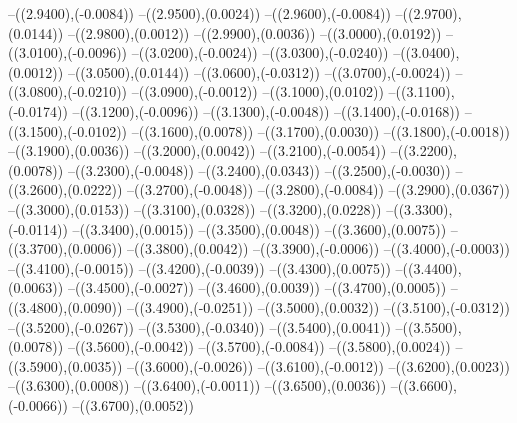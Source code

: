 {	--({\sx*(2.9400)},{\sy*(-0.0084)})
	--({\sx*(2.9500)},{\sy*(0.0024)})
	--({\sx*(2.9600)},{\sy*(-0.0084)})
	--({\sx*(2.9700)},{\sy*(0.0144)})
	--({\sx*(2.9800)},{\sy*(0.0012)})
	--({\sx*(2.9900)},{\sy*(0.0036)})
	--({\sx*(3.0000)},{\sy*(0.0192)})
	--({\sx*(3.0100)},{\sy*(-0.0096)})
	--({\sx*(3.0200)},{\sy*(-0.0024)})
	--({\sx*(3.0300)},{\sy*(-0.0240)})
	--({\sx*(3.0400)},{\sy*(0.0012)})
	--({\sx*(3.0500)},{\sy*(0.0144)})
	--({\sx*(3.0600)},{\sy*(-0.0312)})
	--({\sx*(3.0700)},{\sy*(-0.0024)})
	--({\sx*(3.0800)},{\sy*(-0.0210)})
	--({\sx*(3.0900)},{\sy*(-0.0012)})
	--({\sx*(3.1000)},{\sy*(0.0102)})
	--({\sx*(3.1100)},{\sy*(-0.0174)})
	--({\sx*(3.1200)},{\sy*(-0.0096)})
	--({\sx*(3.1300)},{\sy*(-0.0048)})
	--({\sx*(3.1400)},{\sy*(-0.0168)})
	--({\sx*(3.1500)},{\sy*(-0.0102)})
	--({\sx*(3.1600)},{\sy*(0.0078)})
	--({\sx*(3.1700)},{\sy*(0.0030)})
	--({\sx*(3.1800)},{\sy*(-0.0018)})
	--({\sx*(3.1900)},{\sy*(0.0036)})
	--({\sx*(3.2000)},{\sy*(0.0042)})
	--({\sx*(3.2100)},{\sy*(-0.0054)})
	--({\sx*(3.2200)},{\sy*(0.0078)})
	--({\sx*(3.2300)},{\sy*(-0.0048)})
	--({\sx*(3.2400)},{\sy*(0.0343)})
	--({\sx*(3.2500)},{\sy*(-0.0030)})
	--({\sx*(3.2600)},{\sy*(0.0222)})
	--({\sx*(3.2700)},{\sy*(-0.0048)})
	--({\sx*(3.2800)},{\sy*(-0.0084)})
	--({\sx*(3.2900)},{\sy*(0.0367)})
	--({\sx*(3.3000)},{\sy*(0.0153)})
	--({\sx*(3.3100)},{\sy*(0.0328)})
	--({\sx*(3.3200)},{\sy*(0.0228)})
	--({\sx*(3.3300)},{\sy*(-0.0114)})
	--({\sx*(3.3400)},{\sy*(0.0015)})
	--({\sx*(3.3500)},{\sy*(0.0048)})
	--({\sx*(3.3600)},{\sy*(0.0075)})
	--({\sx*(3.3700)},{\sy*(0.0006)})
	--({\sx*(3.3800)},{\sy*(0.0042)})
	--({\sx*(3.3900)},{\sy*(-0.0006)})
	--({\sx*(3.4000)},{\sy*(-0.0003)})
	--({\sx*(3.4100)},{\sy*(-0.0015)})
	--({\sx*(3.4200)},{\sy*(-0.0039)})
	--({\sx*(3.4300)},{\sy*(0.0075)})
	--({\sx*(3.4400)},{\sy*(0.0063)})
	--({\sx*(3.4500)},{\sy*(-0.0027)})
	--({\sx*(3.4600)},{\sy*(0.0039)})
	--({\sx*(3.4700)},{\sy*(0.0005)})
	--({\sx*(3.4800)},{\sy*(0.0090)})
	--({\sx*(3.4900)},{\sy*(-0.0251)})
	--({\sx*(3.5000)},{\sy*(0.0032)})
	--({\sx*(3.5100)},{\sy*(-0.0312)})
	--({\sx*(3.5200)},{\sy*(-0.0267)})
	--({\sx*(3.5300)},{\sy*(-0.0340)})
	--({\sx*(3.5400)},{\sy*(0.0041)})
	--({\sx*(3.5500)},{\sy*(0.0078)})
	--({\sx*(3.5600)},{\sy*(-0.0042)})
	--({\sx*(3.5700)},{\sy*(-0.0084)})
	--({\sx*(3.5800)},{\sy*(0.0024)})
	--({\sx*(3.5900)},{\sy*(0.0035)})
	--({\sx*(3.6000)},{\sy*(-0.0026)})
	--({\sx*(3.6100)},{\sy*(-0.0012)})
	--({\sx*(3.6200)},{\sy*(0.0023)})
	--({\sx*(3.6300)},{\sy*(0.0008)})
	--({\sx*(3.6400)},{\sy*(-0.0011)})
	--({\sx*(3.6500)},{\sy*(0.0036)})
	--({\sx*(3.6600)},{\sy*(-0.0066)})
	--({\sx*(3.6700)},{\sy*(0.0052)})
}
